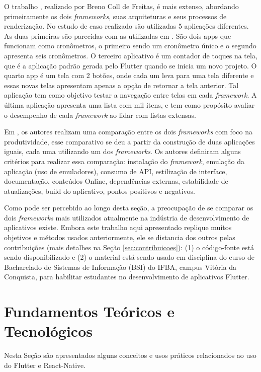 \documentclass[12pt]{article}
\begin{document}
O trabalho \cite{ref_9}, realizado por Breno Coll de Freitas, é mais extenso, abordando primeiramente os dois \textit{frameworks}, suas arquiteturas e seus processos de renderização. No estudo de caso realizado são utilizadas 5 aplicações diferentes. As duas primeiras são parecidas com as utilizadas em \cite{ref_7}. São dois apps que funcionam como cronômetros, o primeiro sendo um cronômetro único e o segundo apresenta seis cronômetros. O terceiro aplicativo é um contador de toques na tela, que é a aplicação padrão gerada pelo Flutter quando se inicia um novo projeto. O quarto app é um tela com 2 botões, onde cada um leva para uma tela diferente e essas novas telas apresentam apenas a opção de retornar a tela anterior. Tal aplicação tem como objetivo testar a navegação entre telas em cada \textit{framework}. A última aplicação apresenta uma lista com mil itens, e tem como propósito avaliar o desempenho de cada \textit{framework} ao lidar com listas extensas.

Em \cite{ref_8}, os autores realizam uma comparação entre os dois \textit{frameworks} com foco na produtividade, esse comparativo se deu a partir da construção de duas aplicações iguais, cada uma utilizando um dos \textit{frameworks}. Os autores definiram alguns critérios para realizar essa comparação: instalação do \textit{framework}, emulação da aplicação (uso de emuladores), consumo de API, estilização de interface, documentação, conteúdos Online, dependências externas, estabilidade de atualizações, build do aplicativo, pontos positivos e negativos. 

Como pode ser percebido ao longo desta seção, a preocupação de se comparar os dois \textit{frameworks} mais utilizados atualmente na indústria de desenvolvimento de aplicativos existe. Embora este trabalho aqui apresentado replique muitos objetivos e métodos usados anteriormente, ele se distancia dos outros pelas contribuições (mais detalhes na Seção \ref{sec:contribuicoes}): (1) o código-fonte está sendo disponibilizado e (2) o material está sendo usado em disciplina do curso de Bacharelado de Sistemas de Informação (BSI) do IFBA, campus Vitória da Conquista, para habilitar estudantes no desenvolvimento de aplicativos Flutter.

\section{Fundamentos Teóricos e Tecnológicos} \label{sec:FTT}

Nesta Seção são apresentados alguns conceitos e usos práticos relacionados ao uso do Flutter e React-Native.
\end{document}
